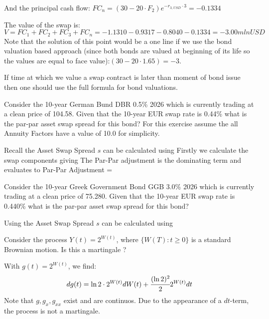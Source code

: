 \documentclass[12pt,a4paper]{exam}
\begin{document}
\begin{questions}
\begin{solution}
\begin{enumerate}[label=(\alph*),font=\itshape]
And the principal cash flow:
$FC_n=(30-20\cdot F_2)e^{-r_{3,USD}\cdot 3} = -0.1334$

The value of the swap is:
\begin{equation*}
V=FC_1+FC_2+FC_3+FC_n=-1.1310-0.9317-0.8040-0.1334=-3.00 mlnUSD
\end{equation*}
Note that the solution of this point would be a one line if we use the bond valuation based approach (since both bonds are valued at beginning of its life so the values are equal to face value):$(30-20\cdot 1.65)=-3$.

If time at which we value a swap contract is later than moment of bond issue then one should use the full formula for bond valuations.
\end{enumerate}
\end{solution}

\question Consider the 10-year German Bund DBR 0.5\% 2026 which is currently trading at a clean price of 104.58. 
Given that the 10-year EUR swap rate is 0.44\% what is the par-par asset swap spread for this bond? 
For this exercise assume the all Annuity Factors have a value of 10.0 for simplicity.
\begin{solution}
Recall the Asset Swap Spread $s$ can be calculated using 
Firstly we calculate the swap components giving 
The Par-Par adjustment is the dominating term and evaluates to
Par-Par Adjustment =

\end{solution}

\question Consider the 10-year Greek Government Bond GGB 3.0\% 2026 which is currently trading at a clean price of 75.280. Given that the 10-year EUR swap rate is 0.440\% what is the par-par asset swap spread for this bond?

\begin{solution}
Using the Asset Swap Spread $s$ can be calculated using  
%
\end{solution}


\question Consider the process $Y(t) = 2^{W(t)}$, where $\{W(T):t\geq 0\}$ is a standard Brownian motion. Is this a martingale ?
\fillwithlines{3cm}
\begin{solution}
With $g(t)=2^{W(t)}$, we find:
\begin{equation*}
dg(t) = \ln2\cdot 2^{W(t)}dW(t) +\cfrac{(\ln2)^2}{2}2^{W(t)}dt
\end{equation*}
Note that $g, g_{x}, g_{xx}$ exist and are continuos. 
Due to the appearance of a $dt$-term, the process is not a martingale.
\end{solution}


\end{questions}
\end{document}

